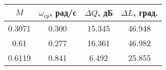 \begin{tabular}{|c|c|c|c|}
\hline
   $M$ &  $\omega_{ср}$, рад/с &  $\Delta Q$, дБ &  $\Delta L$, град. \\
\hline
0.3071 &                 0.300 &          15.345 &             46.948 \\
  0.61 &                 0.277 &          16.361 &             46.982 \\
0.6119 &                 0.841 &           6.492 &             25.855 \\
\hline
\end{tabular}
